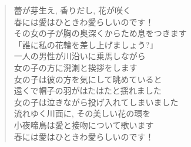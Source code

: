 \begin{quote}
\begin{multicols}{2}
	蕾が芽生え, 香りだし, 花が咲く\\
	春には愛はひときわ愛らしいのです！ \\
	その女の子が胸の奥深くからため息をつきます \\
	「誰に私の花輪を差し上げましょう?」\\

	一人の男性が川沿いに乗馬しながら \\
	女の子の方に溌溂と挨拶をします\\
	女の子は彼の方を気にして眺めていると \\
	遠くで帽子の羽がはたはたと揺れました \\

	女の子は泣きながら投げ入れてしまいました \\
	流れゆく川面に, その美しい花の環を \\
	小夜啼鳥は愛と接吻について歌います \\
	春には愛はひときわ愛らしいのです！ 
\end{multicols}
\end{quote}


